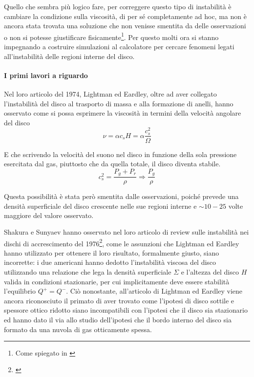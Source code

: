 \documentclass[a4paperbi]{article}
\begin{document}
	Quello che sembra più logico fare, per correggere questo tipo di instabilità è cambiare la condizione sulla viscosità, di per sé completamente ad hoc, ma non è ancora stata trovata una soluzione che non venisse smentita da delle osservazioni o non si potesse giustificare fisicamente\footnote{Come spiegato in \cite{Pringle1981}}. Per questo molti ora si stanno impegnando a costruire simulazioni al calcolatore per cercare fenomeni legati all'instabilità delle regioni interne del disco.

	\paragraph{I primi lavori a riguardo}	
	
	Nel loro articolo del 1974, Lightman ed Eardley, oltre ad aver collegato l'instabilità del disco al trasporto di massa e alla formazione di anelli, hanno osservato come si possa esprimere la viscosità in termini della velocità angolare del disco
	\begin{equation}
		\nu=\alpha c_sH=\alpha\frac{c_s^2}{\Omega}
	\end{equation}
	
	E che scrivendo la velocità del suono nel disco in funzione della sola pressione esercitata dal gas, piuttosto che da quella totale, il disco diventa stabile.
	\begin{equation}
		c_s^2=\frac{P_g+P_r}{\rho}\Longrightarrow\frac{P_g}{\rho}
	\end{equation}
	
	Questa possibilità è stata però smentita dalle osservazioni, poiché prevede una densità superficiale del disco crescente nelle sue regioni interne e $\sim10-25$ volte maggiore del valore osservato.
	
	Shakura e Sunyaev hanno osservato nel loro articolo di review sulle instabilità nei dischi di accrescimento del 1976\footnote{\cite{ShakuraSunyaev1976}}, come le assunzioni che Lightman ed Eardley hanno utilizzato per ottenere il loro risultato, formalmente giusto, siano incorrette: i due americani hanno dedotto l'instabilità viscosa del disco utilizzando una relazione che lega la densità superficiale $\Sigma$ e l'altezza del disco $H$ valida in condizioni stazionarie, per cui implicitamente deve essere stabilità l'equilibrio $Q^+=Q^-$. Ciò nonostante, all'articolo di Lightman ed Eardley viene ancora riconosciuto il primato di aver trovato  come l'ipotesi di disco sottile e spessore ottico ridotto siano incompatibili con l'ipotesi che il disco sia stazionario ed hanno dato il via allo studio dell'ipotesi che il bordo interno del disco sia formato da una nuvola di gas otticamente spessa.
	
\end{document}
